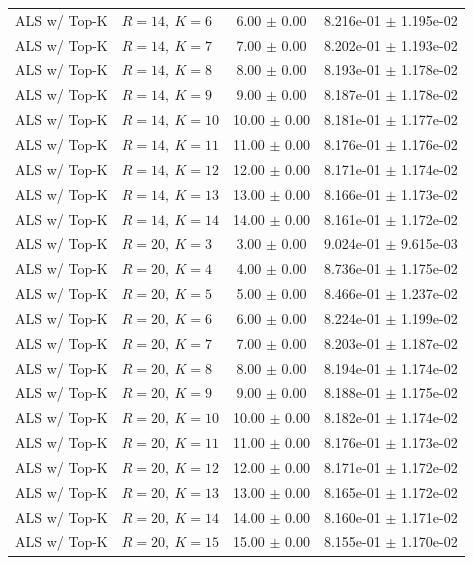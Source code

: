 \begin{table}[t]
\begin{tabular}{@{}llcc@{}}
ALS w/ Top-K & \(R=14,\ K=6\) & 6.00 $\pm$ 0.00 & 8.216e-01 $\pm$ 1.195e-02 \\
ALS w/ Top-K & \(R=14,\ K=7\) & 7.00 $\pm$ 0.00 & 8.202e-01 $\pm$ 1.193e-02 \\
ALS w/ Top-K & \(R=14,\ K=8\) & 8.00 $\pm$ 0.00 & 8.193e-01 $\pm$ 1.178e-02 \\
ALS w/ Top-K & \(R=14,\ K=9\) & 9.00 $\pm$ 0.00 & 8.187e-01 $\pm$ 1.178e-02 \\
ALS w/ Top-K & \(R=14,\ K=10\) & 10.00 $\pm$ 0.00 & 8.181e-01 $\pm$ 1.177e-02 \\
ALS w/ Top-K & \(R=14,\ K=11\) & 11.00 $\pm$ 0.00 & 8.176e-01 $\pm$ 1.176e-02 \\
ALS w/ Top-K & \(R=14,\ K=12\) & 12.00 $\pm$ 0.00 & 8.171e-01 $\pm$ 1.174e-02 \\
ALS w/ Top-K & \(R=14,\ K=13\) & 13.00 $\pm$ 0.00 & 8.166e-01 $\pm$ 1.173e-02 \\
ALS w/ Top-K & \(R=14,\ K=14\) & 14.00 $\pm$ 0.00 & 8.161e-01 $\pm$ 1.172e-02 \\
ALS w/ Top-K & \(R=20,\ K=3\) & 3.00 $\pm$ 0.00 & 9.024e-01 $\pm$ 9.615e-03 \\
ALS w/ Top-K & \(R=20,\ K=4\) & 4.00 $\pm$ 0.00 & 8.736e-01 $\pm$ 1.175e-02 \\
ALS w/ Top-K & \(R=20,\ K=5\) & 5.00 $\pm$ 0.00 & 8.466e-01 $\pm$ 1.237e-02 \\
ALS w/ Top-K & \(R=20,\ K=6\) & 6.00 $\pm$ 0.00 & 8.224e-01 $\pm$ 1.199e-02 \\
ALS w/ Top-K & \(R=20,\ K=7\) & 7.00 $\pm$ 0.00 & 8.203e-01 $\pm$ 1.187e-02 \\
ALS w/ Top-K & \(R=20,\ K=8\) & 8.00 $\pm$ 0.00 & 8.194e-01 $\pm$ 1.174e-02 \\
ALS w/ Top-K & \(R=20,\ K=9\) & 9.00 $\pm$ 0.00 & 8.188e-01 $\pm$ 1.175e-02 \\
ALS w/ Top-K & \(R=20,\ K=10\) & 10.00 $\pm$ 0.00 & 8.182e-01 $\pm$ 1.174e-02 \\
ALS w/ Top-K & \(R=20,\ K=11\) & 11.00 $\pm$ 0.00 & 8.176e-01 $\pm$ 1.173e-02 \\
ALS w/ Top-K & \(R=20,\ K=12\) & 12.00 $\pm$ 0.00 & 8.171e-01 $\pm$ 1.172e-02 \\
ALS w/ Top-K & \(R=20,\ K=13\) & 13.00 $\pm$ 0.00 & 8.165e-01 $\pm$ 1.172e-02 \\
ALS w/ Top-K & \(R=20,\ K=14\) & 14.00 $\pm$ 0.00 & 8.160e-01 $\pm$ 1.171e-02 \\
ALS w/ Top-K & \(R=20,\ K=15\) & 15.00 $\pm$ 0.00 & 8.155e-01 $\pm$ 1.170e-02 \\

\end{tabular}
\end{table}
